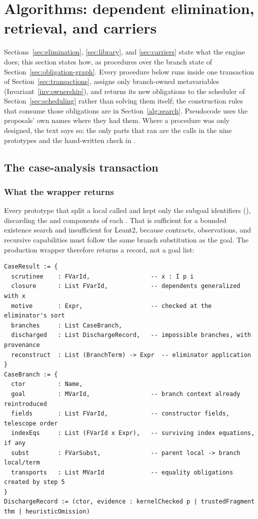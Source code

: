 \section{Algorithms: dependent elimination, retrieval, and carriers}\label{alg:elim}

Sections~\ref{sec:elimination}, \ref{sec:library}, and \ref{sec:carriers} state what the engine does; this section states how, as procedures over the branch state of Section~\ref{sec:obligation-graph}. Every procedure below runs inside one transaction of Section~\ref{sec:transactions}, assigns only branch-owned metavariables (Invariant~\ref{inv:ownership}), and returns its new obligations to the scheduler of Section~\ref{sec:scheduling} rather than solving them itself; the construction rules that consume those obligations are in Section~\ref{alg:search}. Pseudocode uses the proposals' own names where they had them. Where a procedure was only designed, the text says so; the only parts that ran are the  calls in the nine prototypes and the hand-written  check in .

\subsection{The case-analysis transaction}\label{alg:cases}

\subsubsection{What the wrapper returns}

Every prototype that split a local called  and kept only the subgoal identifiers (), discarding the  and  components of each . That is sufficient for a bounded existence search and insufficient for Leant2, because contracts, observations, and recursive capabilities must follow the same branch substitution as the goal. The production wrapper therefore returns a record, not a goal list:

\begin{lstlisting}
CaseResult := {
  scrutinee    : FVarId,                 -- x : I p i
  closure      : List FVarId,            -- dependents generalized with x
  motive       : Expr,                   -- checked at the eliminator's sort
  branches     : List CaseBranch,
  discharged   : List DischargeRecord,   -- impossible branches, with provenance
  reconstruct  : List (BranchTerm) -> Expr  -- eliminator application
}
CaseBranch := {
  ctor         : Name,
  goal         : MVarId,                 -- branch context already reintroduced
  fields       : List FVarId,            -- constructor fields, telescope order
  indexEqs     : List (FVarId x Expr),   -- surviving index equations, if any
  subst        : FVarSubst,              -- parent local -> branch local/term
  transports   : List MVarId             -- equality obligations created by step 5
}
DischargeRecord := (ctor, evidence : kernelChecked p | trustedFragment thm | heuristicOmission)
\end{lstlisting}


